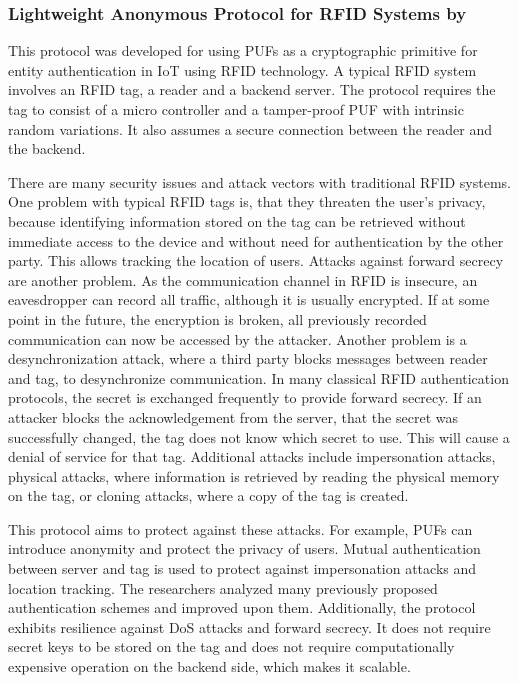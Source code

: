 \subsubsection{Lightweight Anonymous Protocol for RFID Systems by \citeauthor*{Gope2018}}
\label{sec:review_protocol_2}

This protocol was developed for using PUFs as a cryptographic primitive for
entity authentication in IoT using RFID technology.
A typical RFID system involves an RFID tag, a reader and a backend server.
The protocol requires the tag to consist of a micro controller and a tamper-proof PUF with
intrinsic random variations. It also assumes a secure connection between the reader and the backend. \cite{Gope2018}

There are many security issues and attack vectors with traditional RFID systems.
One problem with typical RFID tags is, that they threaten the user's privacy,
because identifying information stored on the tag can be retrieved without immediate
access to the device and without need for authentication by the other party.
This allows tracking the location of users.
Attacks against forward secrecy are another problem. As the communication channel in RFID
is insecure, an eavesdropper can record all traffic, although it is usually encrypted.
If at some point in the future, the encryption is broken, all previously recorded communication
can now be accessed by the attacker.
Another problem is a desynchronization attack, where a third party blocks messages between
reader and tag, to desynchronize communication. In many classical RFID authentication protocols,
the secret is exchanged frequently to provide forward secrecy. If an attacker blocks the acknowledgement
from the server, that the secret was successfully changed, the tag does not know which secret to use.
This will cause a denial of service for that tag.
Additional attacks include impersonation attacks, physical attacks, where information is retrieved
by reading the physical memory on the tag, or cloning attacks, where a copy of the tag is created. \cite{Gope2018}

This protocol aims to protect against these attacks. For example, PUFs can introduce anonymity and protect the privacy of users.
Mutual authentication between server and tag is used to protect against impersonation attacks and location tracking.
The researchers analyzed many previously proposed authentication schemes and improved upon them.
Additionally, the protocol exhibits resilience against \ac{DoS} attacks and
forward secrecy. It does not require secret keys to be stored on the tag and does not require
computationally expensive operation on the backend side, which makes it scalable. \cite{Gope2018}

